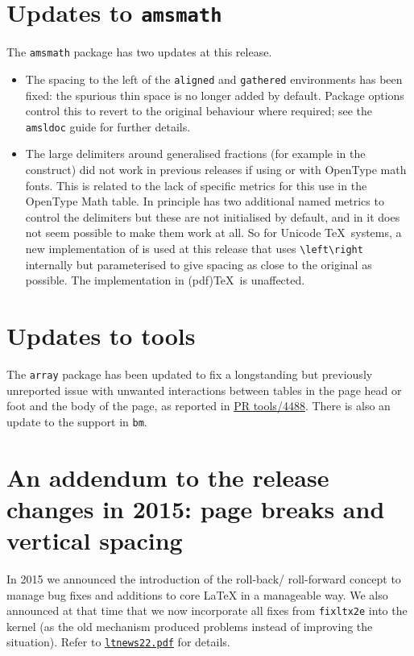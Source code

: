 \documentclass{ltnews}
\providecommand\pkg[1]{\texttt{#1}}
\providecommand\env[1]{\texttt{#1}}
\providecommand\file[1]{\texttt{#1}}
\begin{document}
\section{Updates to \pkg{amsmath}}
The \pkg{amsmath} package has two updates at this release.
\begin{itemize}
\item The spacing to the left of the \env{aligned} and
  \env{gathered} environments has been fixed: the spurious thin
  space is no longer added by default. Package options control this
  to revert to the original behaviour where required; see the
  \file{amsldoc} guide for further details.
\item The large delimiters around generalised fractions (for example
  in the  construct) did not work in previous releases if
  using  or  with OpenType math fonts. This is
  related to the lack of specific metrics for this use in the OpenType Math
  table. In principle  has two additional named metrics
  to control the delimiters but these are not initialised by default,
  and in  it does not seem possible to make them work at all.
  So for Unicode \TeX\ systems, a new implementation of
   is used at this release that uses \verb|\left\right|
  internally but parameterised to give spacing as close to the
  original as possible. The implementation in (pdf)\TeX\ is
  unaffected.
\end{itemize}

\section{Updates to \textsf{tools}}
The \pkg{array} package has been updated to fix a longstanding but
previously unreported issue with unwanted interactions between tables
in the page head or foot and the body of the page, as reported in
\href{http://www.latex-project.org/cgi-bin/ltxbugs2html?pr=tools/4488}{PR
  tools/4488}.
There is also an update to the  support in \pkg{bm}.

\section{An addendum to the release changes in 2015:  page breaks and vertical spacing}

In 2015 we announced the introduction of the roll-back\slash
roll-forward concept to manage bug fixes and additions to core
\LaTeX{} in a manageable way. We also announced at that time
that we now incorporate all fixes from \pkg{fixltx2e} into the
kernel (as the old mechanism produced problems instead of improving
the situation). Refer to
\href{https://www.latex-project.org/news/latex2e-news/ltnews22.pdf}{\file{ltnews22.pdf}}
for details.
\end{document}
